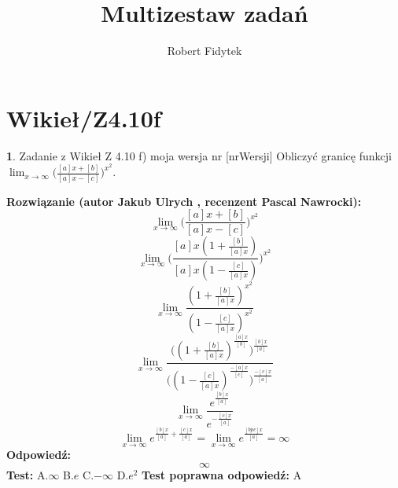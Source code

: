 \documentclass[12pt, a4paper]{article}
\title{Multizestaw zadań}
\author{Robert Fidytek}
\date{}
\theoremstyle{definition} %
\newtheorem{zad}{}
\newcommand{\kategoria}[1]{\section{#1}} %
\newcommand{\zadStart}[1]{\begin{zad}#1\newline} %
\newcommand{\zadStop}{\end{zad}}   %
\newcommand{\rozwStart}[2]{\noindent \textbf{Rozwiązanie (autor #1 , recenzent #2): }\newline} %
\newcommand{\rozwStop}{\newline}                                            %
\newcommand{\odpStart}{\noindent \textbf{Odpowiedź:}\newline}    %
\newcommand{\odpStop}{\newline}                                             %
\newcommand{\testStart}{\noindent \textbf{Test:}\newline} %
\newcommand{\testStop}{\newline} %
\newcommand{\kluczStart}{\noindent \textbf{Test poprawna odpowiedź:}\newline} %
\newcommand{\kluczStop}{\newline} %
\begin{document}
\maketitle


\kategoria{Wikieł/Z4.10f}
\zadStart{Zadanie z Wikieł Z 4.10 f) moja wersja nr [nrWersji]}
Obliczyć granicę funkcji $\lim_{x \to \infty}\big(\frac{[a]x+[b]}{[a]x-[c]}\big)^{x^{2}}$.
\zadStop
\rozwStart{Jakub Ulrych}{Pascal Nawrocki}
$$\lim_{x \to \infty}\big(\frac{[a]x+[b]}{[a]x-[c]}\big)^{x^{2}}$$
$$\lim_{x \to \infty}\bigg(\frac{[a]x(1+\frac{[b]}{[a]x})}{[a]x(1-\frac{[c]}{[a]x})}\bigg)^{x^{2}}$$
$$\lim_{x \to \infty}\frac{(1+\frac{[b]}{[a]x})^{x^{2}}}{(1-\frac{[c]}{[a]x})^{x^{2}}}$$
$$\lim_{x \to \infty}\frac{\big((1+\frac{[b]}{[a]x})^{\frac{[a]x}{[b]}}\big)^{\frac{[b]x}{[a]}}}{\big((1-\frac{[c]}{[a]x})^{\frac{-[a]x}{[c]}}\big)^{\frac{-[c]x}{[a]}}}$$
$$\lim_{x \to \infty}\frac{e^{\frac{[b]x}{[a]}}}{e^{-\frac{[c]x}{[a]}}}$$
$$\lim_{x \to \infty}e^{\frac{[b]x}{[a]}+\frac{[c]x}{[a]}}=\lim_{x \to \infty}e^{\frac{[bpc]x}{[a]}}=\infty$$
\rozwStop
\odpStart
$$\infty$$
\odpStop
\testStart
A.$\infty$
B.$e$
C.$-\infty$
D.$e^{2}$
\testStop
\kluczStart
A
\kluczStop
\end{document}
